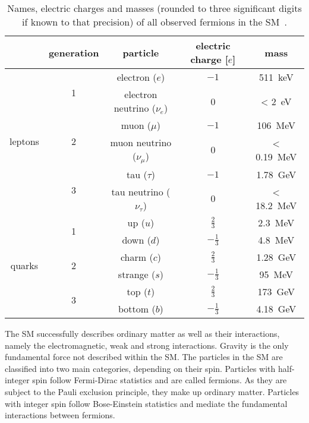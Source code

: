 \begin{table}
	\centering
	\setlength\heavyrulewidth{0.2ex}
	\small
	\caption{Names, electric charges and masses (rounded to three significant digits if known to that precision) of all observed fermions in the SM~\cite{pdg}.}
	\begin{tabular} {c c c c c}
		
		\toprule
				& generation & particle & electric charge [$e$] & mass \\ 
		\midrule 
				\multirow{6}{*}{leptons}& \multirow{2}{*}{1} & electron ($e$)& $-1$ & \SI{511}{\keV}\\
				& & electron neutrino ($\nu_e$) & 0 & < \SI{2}{\eV} \\
				& \multirow{2}{*}{2} & muon ($\mu$)& $-1$ & \SI{106}{\MeV}\\
				& & muon neutrino ($\nu_\mu$) & 0 & < \SI{0.19}{\MeV} \\
				& \multirow{2}{*}{3} & tau ($\tau$)& $-1$ & \SI{1.78}{\GeV}\\
				& & tau neutrino ($\nu_\tau$) & 0 & < \SI{18.2}{\MeV} \\
		\midrule 
				\multirow{6}{*}{quarks}& \multirow{2}{*}{1} & up ($u$)& $\frac{2}{3}$ & \SI{2.3}{\MeV}\\
				& & down ($d$) & $-\frac{1}{3}$ & \SI{4.8}{\MeV} \\
				& \multirow{2}{*}{2} & charm ($c$)& $\frac{2}{3}$ & \SI{1.28}{\GeV}\\
				& & strange ($s$) & $-\frac{1}{3}$ &\SI{95}{\MeV} \\
				& \multirow{2}{*}{3} & top ($t$)& $\frac{2}{3}$ & \SI{173}{\GeV}\\
				& & bottom ($b$) & $-\frac{1}{3}$ & \SI{4.18}{\GeV} \\
		\bottomrule
	\end{tabular}\vspace{3mm}
	\label{tab:particles_fermions}   
\end{table}

The SM successfully describes  ordinary matter as well as their interactions, namely the electromagnetic, weak and strong interactions. Gravity is the only fundamental force not described within the SM. The particles in the SM are classified into two main categories, depending on their spin. Particles with half-integer spin follow Fermi-Dirac statistics and are called fermions. As they are subject to the Pauli exclusion principle, they make up ordinary matter. Particles with integer spin follow Bose-Einstein statistics and mediate the fundamental interactions between fermions. 

